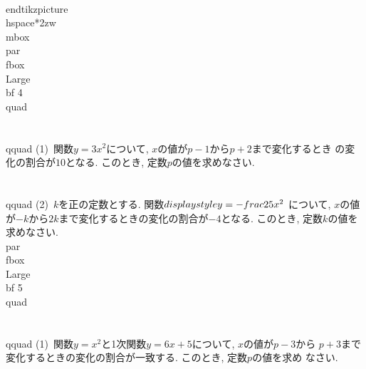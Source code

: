 
\\end{tikzpicture}
\\hspace*{2zw}\\mbox{}
\\par \\fbox{{\\Large\\bf 4}}\\quad
\\\\
\\qquad (1)~関数$y=3x^{2}$について, $x$の値が$p-1$から$p+2$まで変化するとき
の変化の割合が$10$となる. このとき, 定数$p$の値を求めなさい.
\\\\
\\qquad (2)~$k$を正の定数とする. 関数$\\displaystyle y=-\\frac{2}{5}x^{2}$
について, $x$の値が$-k$から$2k$まで変化するときの変化の割合が$-4$となる.
このとき, 定数$k$の値を求めなさい.
\\par \\fbox{{\\Large\\bf 5}}\\quad\\\\
\\qquad (1)~関数$y=x^{2}$と1次関数$y=6x+5$について, $x$の値が$p-3$から
$p+3$まで変化するときの変化の割合が一致する. このとき, 定数$p$の値を求め
なさい.
\\\\
